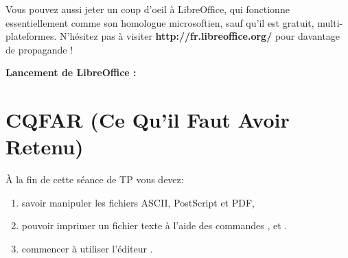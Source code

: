 \documentclass[a4paper,10pt]{article}
\begin{document}
Vous pouvez aussi jeter un coup d'oeil à LibreOffice, 
qui fonctionne essentiellement comme son homologue microsoftien,
sauf qu'il est gratuit, multi-plateformes.
N'hésitez pas à visiter \textbf{http://fr.libreoffice.org/} pour davantage de
propagande !

\textbf{Lancement de LibreOffice : } 

\section{CQFAR (Ce Qu'il Faut Avoir Retenu)}

À la fin de cette séance de TP vous devez:
\begin{enumerate}
  \item savoir manipuler les fichiers ASCII, PostScript et PDF,
  \item pouvoir imprimer un fichier texte à l'aide des commandes ,
         et .
  \item commencer à utiliser l'éditeur .
\end{enumerate}
\end{document}
